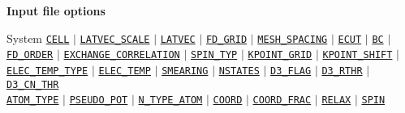 \begin{frame}[allowframebreaks]{\textbf{Input file options}} \label{Index}
\vspace{-2mm}
\begin{block}{System}
\hyperlink{CELL}{\texttt{CELL}} $\vert$ \hyperlink{LATVEC_SCALE}{\texttt{LATVEC\_SCALE}} $\vert$ \hyperlink{LATVEC}{\texttt{LATVEC}}  $\vert$ \hyperlink{FD_GRID}{\texttt{FD\_GRID}} $\vert$ \hyperlink{MESH_SPACING}{\texttt{MESH\_SPACING}} $\vert$ \hyperlink{ECUT}{\texttt{ECUT}} $\vert$ \hyperlink{BC}{\texttt{BC}} $\vert$ \hyperlink{FD_ORDER}{\texttt{FD\_ORDER}} $\vert$ \hyperlink{EXCHANGE_CORRELATION}{\texttt{EXCHANGE\_CORRELATION}} $\vert$ \hyperlink{SPIN_TYP}{\texttt{SPIN\_TYP}} $\vert$ \hyperlink{KPOINT_GRID}{\texttt{KPOINT\_GRID}} $\vert$ \hyperlink{KPOINT_SHIFT}{\texttt{KPOINT\_SHIFT}} $\vert$ \hyperlink{ELEC_TEMP_TYPE}{\texttt{ELEC\_TEMP\_TYPE}} $\vert$ \hyperlink{ELEC_TEMP}{\texttt{ELEC\_TEMP}} $\vert$ \hyperlink{SMEARING}{\texttt{SMEARING}} $\vert$ \hyperlink{NSTATES}{\texttt{NSTATES}}     $\vert$ \hyperlink{D3_FLAG}{\texttt{D3\_FLAG}} $\vert$ \hyperlink{D3_RTHR}{\texttt{D3\_RTHR}} $\vert$ \hyperlink{D3_CN_THR}{\texttt{D3\_CN\_THR}}\\
\hyperlink{ATOM_TYPE}{\texttt{ATOM\_TYPE}} $\vert$ \hyperlink{PSEUDO_POT}{\texttt{PSEUDO\_POT}}  $\vert$ \hyperlink{N_TYPE_ATOM}{\texttt{N\_TYPE\_ATOM}} $\vert$ \hyperlink{COORD}{\texttt{COORD}} $\vert$ \hyperlink{COORD_FRAC}{\texttt{COORD\_FRAC}} $\vert$ \hyperlink{RELAX}{\texttt{RELAX}} $\vert$ \hyperlink{SPIN}{\texttt{SPIN}} 
\end{block}


\end{frame}
